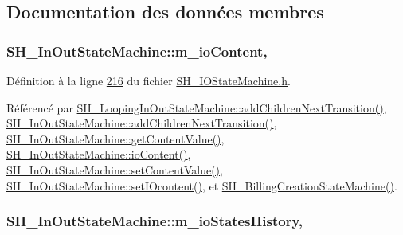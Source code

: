 \subsection{Documentation des données membres}
\hypertarget{classSH__InOutStateMachine_a8cfbc27eef057bf37b7711bdfef2077e}{
\subsubsection[{m\-\_\-io\-Content}]{\setlength{\rightskip}{0pt plus 5cm}S\-H\-\_\-\-In\-Out\-State\-Machine\-::m\-\_\-io\-Content\hspace{0.3cm}{\ttfamily [protected]}, {\ttfamily [inherited]}}}\label{classSH__InOutStateMachine_a8cfbc27eef057bf37b7711bdfef2077e}


Définition à la ligne \hyperlink{SH__IOStateMachine_8h_source_l00216}{216} du fichier \hyperlink{SH__IOStateMachine_8h_source}{S\-H\-\_\-\-I\-O\-State\-Machine.\-h}.



Référencé par \hyperlink{classSH__LoopingInOutStateMachine_abfae9f47019379f270496de46845c729}{S\-H\-\_\-\-Looping\-In\-Out\-State\-Machine\-::add\-Children\-Next\-Transition()}, \hyperlink{classSH__InOutStateMachine_aa78420f8778d7777809aad77eb8473b4}{S\-H\-\_\-\-In\-Out\-State\-Machine\-::add\-Children\-Next\-Transition()}, \hyperlink{classSH__InOutStateMachine_aa1a3bd3c0ea8a59b9bc916dc718eb9ca}{S\-H\-\_\-\-In\-Out\-State\-Machine\-::get\-Content\-Value()}, \hyperlink{classSH__InOutStateMachine_aaca105fbd5f5cc3bac115389ad3694c5}{S\-H\-\_\-\-In\-Out\-State\-Machine\-::io\-Content()}, \hyperlink{classSH__InOutStateMachine_a9ab1534306b2bdb62743d4bcefe40c17}{S\-H\-\_\-\-In\-Out\-State\-Machine\-::set\-Content\-Value()}, \hyperlink{classSH__InOutStateMachine_a8271a7ec7d5f6502449dd3b4da5f4155}{S\-H\-\_\-\-In\-Out\-State\-Machine\-::set\-I\-Ocontent()}, et \hyperlink{classSH__BillingCreationStateMachine_ad62b77fa4aeafe200056ff3974562f83}{S\-H\-\_\-\-Billing\-Creation\-State\-Machine()}.

\hypertarget{classSH__InOutStateMachine_ac46ad1af230e1b2156d805275690dec3}{
\subsubsection[{m\-\_\-io\-States\-History}]{\setlength{\rightskip}{0pt plus 5cm}S\-H\-\_\-\-In\-Out\-State\-Machine\-::m\-\_\-io\-States\-History\hspace{0.3cm}{\ttfamily [protected]}, {\ttfamily [inherited]}}}\label{classSH__InOutStateMachine_ac46ad1af230e1b2156d805275690dec3}


